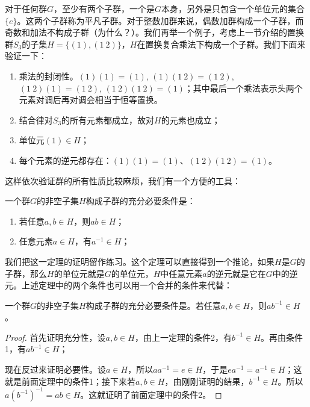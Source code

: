 \documentclass{article}
\begin{document}
对于任何群$G$，至少有两个子群，一个是$G$本身，另外是只包含一个单位元的集合$\{e\}$。这两个子群称为平凡子群。对于整数加群来说，偶数加群构成一个子群，而奇数和加法不构成子群（为什么？）。我们再举一个例子，考虑上一节介绍的置换群$S_3$的子集$H = \{(1), (1\ 2)\}$，$H$在置换复合乘法下构成一个子群。我们下面来验证一下：

\begin{enumerate}
\item 乘法的封闭性。$(1)(1) = (1)$, $(1)(1\ 2) = (1\ 2)$, $(1\ 2)(1) = (1\ 2)$, $(1\ 2) (1\ 2) = (1)$；其中最后一个乘法表示头两个元素对调后再对调会相当于恒等置换。
\item 结合律对$S_3$的所有元素都成立，故对$H$的元素也成立；
\item 单位元$(1) \in H$；
\item 每个元素的逆元都存在：$(1)(1) = (1)$、$(1\ 2) (1\ 2) = (1)$。
\end{enumerate}

这样依次验证群的所有性质比较麻烦，我们有一个方便的工具：

\begin{theorem}
一个群$G$的非空子集$H$构成子群的充分必要条件是：
\begin{enumerate}
\item 若任意$a, b \in H$，则$ab \in H$；
\item 任意元素$a \in H$，有$a^{-1} \in H$；
\end{enumerate}
\label{theorem:subgroup}
\end{theorem}

我们把这一定理的证明留作练习。这个定理可以直接得到一个推论，如果$H$是$G$的子群，那么$H$的单位元就是$G$的单位元，$H$中任意元素$a$的逆元就是它在$G$中的逆元。上述定理中的两个条件也可以用一个合并的条件来代替：

\begin{theorem}
一个群$G$的非空子集$H$构成子群的充分必要条件是。若任意$a, b \in H$，则$ab^{-1} \in H$。
\label{theorem:subgroup-2}
\end{theorem}

\begin{proof}
首先证明充分性，设$a, b \in H$，由上一定理的条件2，有$b^{-1} \in H$。再由条件1，有$ab^{-1} \in H$；

现在反过来证明必要性。设$a \in H$，所以$aa^{-1} = e \in H$，于是$ea^{-1} = a^{-1} \in H$；这就是前面定理中的条件1；接下来若$a, b \in H$，由刚刚证明的结果，$b^{-1} \in H$。所以$a(b^{-1})^{-1} = ab \in H$。这就证明了前面定理中的条件2。
\end{proof}
\end{document}
